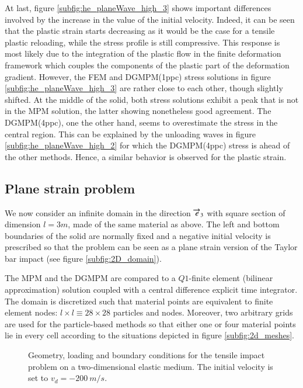 At last, figure \ref{subfig:he_planeWave_high_3} shows important differences involved by the increase in the value of the initial velocity.
Indeed, it can be seen that the plastic strain starts decreasing as it would be the case for a tensile plastic reloading, while the stress profile is still compressive.
This response is most likely due to the integration of the plastic flow in the finite deformation framework which couples the components of the plastic part of the deformation gradient.
However, the FEM and DGMPM(1ppc) stress solutions in figure \ref{subfig:he_planeWave_high_3} are rather close to each other, though slightly shifted.
At the middle of the solid, both stress solutions exhibit a peak that is not in the MPM solution, the latter showing nonetheless good agreement.
The DGMPM(4ppc), one the other hand, seems to overestimate the stress in the central region.
This can be explained by the unloading waves in figure \ref{subfig:he_planeWave_high_2} for which the DGMPM(4ppc) stress is ahead of the other methods.
Hence, a similar behavior is observed for the plastic strain.

\subsection{Plane strain problem}
\label{sec:plane-strain-problem}
We now consider an infinite domain in the direction ${\overrightarrow{e}}_3$ with square section of dimension $l=3m$, made of the same material as above.
The left and bottom boundaries of the solid are normally fixed and a negative initial velocity is prescribed so that the problem can be seen as a plane strain version of the Taylor bar impact (see figure \ref{subfig:2D_domain}).


The MPM and the DGMPM are compared to a $Q1$-finite element (bilinear approximation) solution coupled with a central difference explicit time integrator.
The domain is discretized such that material points are equivalent to finite element nodes: $l\times l \equiv 28 \times 28$ particles and nodes.
Moreover, two arbitrary grids are used for the particle-based methods so that either one or four material points lie in every cell according to the situations depicted in figure \ref{subfig:2d_meshes}.
\begin{figure}[ht]
  \centering
   \qquad
  \caption{Geometry, loading and boundary conditions for the tensile impact problem on a two-dimensional elastic medium. The initial velocity is set to $v_d=-200 \: m/s$.}
  \label{fig:PS_domain}
\end{figure}

